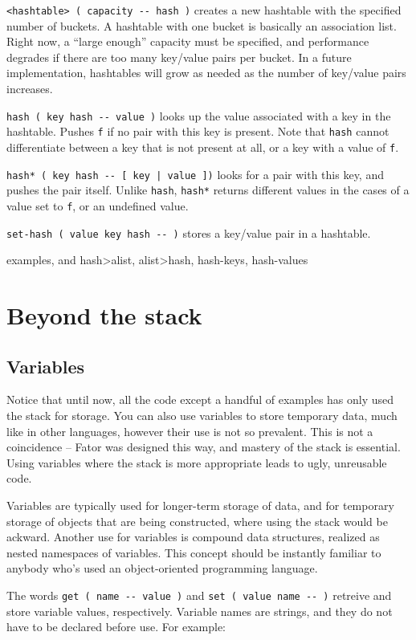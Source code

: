 \documentclass[english]{article}
\begin{document}
\texttt{<hashtable> ( capacity -{}- hash )} creates a new hashtable with the specified number of buckets. A hashtable with one bucket is basically an association list. Right now, a ``large enough'' capacity must be specified, and performance degrades if there are too many key/value pairs per bucket. In a future implementation, hashtables will grow as needed as the number of key/value pairs increases.

\texttt{hash ( key hash -{}- value )} looks up the value associated with a key in the hashtable. Pushes \texttt{f} if no pair with this key is present. Note that \texttt{hash} cannot differentiate between a key that is not present at all, or a key with a value of \texttt{f}.

\texttt{hash* ( key hash -{}- {[} key | value {]})} looks for
a pair with this key, and pushes the pair itself. Unlike \texttt{hash},
\texttt{hash{*}} returns different values in the cases of a value
set to \texttt{f}, or an undefined value.

\texttt{set-hash ( value key hash -{}- )} stores a key/value pair in a hashtable.

examples, and hash>alist, alist>hash, hash-keys, hash-values

\section{Beyond the stack}

\subsection{Variables}

Notice that until now, all the code except a handful of examples has only used the stack for storage. You can also use variables to store temporary data, much like in other languages, however their use is not so prevalent. This is not a coincidence -- Fator was designed this way, and mastery of the stack is essential. Using variables where the stack is more appropriate leads to ugly, unreusable code.

Variables are typically used for longer-term storage of data, and for temporary storage of objects that are being constructed, where using the stack would be ackward. Another use for variables is compound data structures, realized as nested namespaces of variables. This concept should be instantly familiar to anybody who's used an object-oriented programming language.

The words \texttt{get ( name -{}- value )} and \texttt{set ( value name -{}- )} retreive and store variable values, respectively. Variable names are strings, and they do not have to be declared before use. For example:
\end{document}
